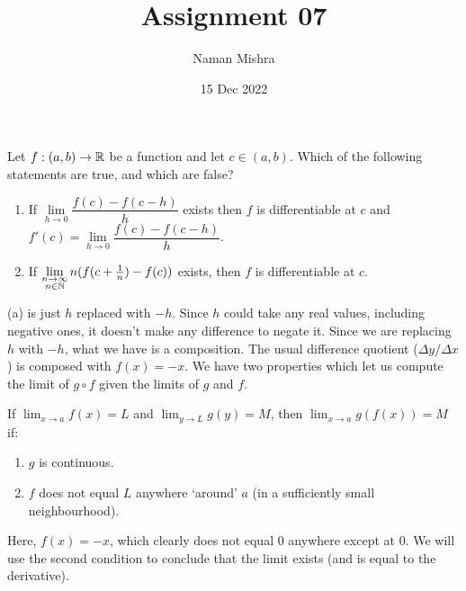 \documentclass[12pt]{article}
\title{Assignment 07}
\author{Naman Mishra}
\date{15 Dec 2022}
\begin{document}
\maketitle

\begin{problem}
    Let $f : (a, b) \to \mathbb{R}$ be a function and let $c \in (a, b)$.
    Which of the following statements are true, and which are false?
    \begin{enumerate}[label=(\alph*)]
        \item If $\lim\limits_{h \to 0} \dfrac{f(c) - f(c - h)}{h}$ exists then $f$ is differentiable at $c$ and $f'(c) = \lim\limits_{h \to 0} \dfrac{f(c) - f(c - h)}{h}$.
        \item If $\lim\limits_{\substack{n \to \infty \\ n \in \mathbb{N}}} n (f( c + \frac{1}{n}) - f(c))$ exists, then $f$ is differentiable at $c$.
    \end{enumerate}
\end{problem}
(a) is just $h$ replaced with $-h$.
Since $h$ could take any real values, including negative ones, it doesn't make any difference to negate it.
Since we are replacing $h$ with $-h$, what we have is a composition.
The usual difference quotient ($\Delta y / \Delta x$) is composed with $f(x) = -x$.
We have two properties which let us compute the limit of $g \circ f$ given the limits of $g$ and $f$.

If $\lim_{x \to a} f(x) = L$ and $\lim_{y \to L} g(y) = M$, then $\lim_{x \to a} g(f(x)) = M$ if:
\begin{enumerate}[label=(\roman*)]
    \item $g$ is continuous.
    \item $f$ does not equal $L$ anywhere `around' $a$ (in a sufficiently small neighbourhood).
\end{enumerate}
Here, $f(x) = -x$, which clearly does not equal 0 anywhere except at 0. We will use the second condition to conclude that the limit exists (and is equal to the derivative).
\end{document}

